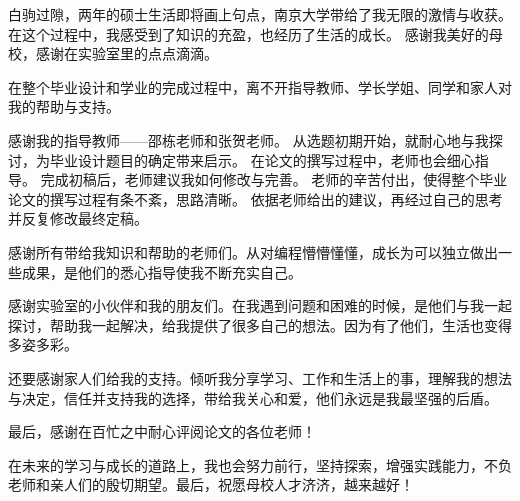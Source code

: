 \documentclass[winfonts,master,twoside]{njuthesis}
\begin{document}
\begin{acknowledgement}
	白驹过隙，两年的硕士生活即将画上句点，南京大学带给了我无限的激情与收获。
	在这个过程中，我感受到了知识的充盈，也经历了生活的成长。
	感谢我美好的母校，感谢在实验室里的点点滴滴。

	在整个毕业设计和学业的完成过程中，离不开指导教师、学长学姐、同学和家人对我的帮助与支持。

	感谢我的指导教师——邵栋老师和张贺老师。
	从选题初期开始，就耐心地与我探讨，为毕业设计题目的确定带来启示。
	在论文的撰写过程中，老师也会细心指导。
	完成初稿后，老师建议我如何修改与完善。
	老师的辛苦付出，使得整个毕业论文的撰写过程有条不紊，思路清晰。
	依据老师给出的建议，再经过自己的思考并反复修改最终定稿。

	感谢所有带给我知识和帮助的老师们。从对编程懵懵懂懂，成长为可以独立做出一些成果，是他们的悉心指导使我不断充实自己。

	感谢实验室的小伙伴和我的朋友们。在我遇到问题和困难的时候，是他们与我一起探讨，帮助我一起解决，给我提供了很多自己的想法。因为有了他们，生活也变得多姿多彩。

	还要感谢家人们给我的支持。倾听我分享学习、工作和生活上的事，理解我的想法与决定，信任并支持我的选择，带给我关心和爱，他们永远是我最坚强的后盾。

	最后，感谢在百忙之中耐心评阅论文的各位老师！

	在未来的学习与成长的道路上，我也会努力前行，坚持探索，增强实践能力，不负老师和亲人们的殷切期望。最后，祝愿母校人才济济，越来越好！
\end{acknowledgement}







\end{document}
